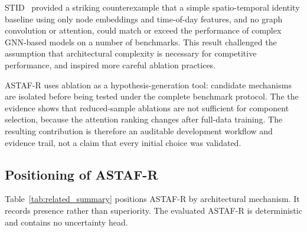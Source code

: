 \documentclass[fleqn,10pt]{wlscirep}
\newenvironment{changedcontent}{\color{changeblue}}{}
\begin{document}
STID~\cite{shao2022stgcn} provided a striking counterexample that a simple spatio-temporal identity baseline using only node embeddings and time-of-day features, and no graph convolution or attention, could match or exceed the performance of complex GNN-based models on a number of benchmarks. This result challenged the assumption that architectural complexity is necessary for competitive performance, and inspired more careful ablation practices.

\begin{changedcontent}
ASTAF-R uses ablation as a hypothesis-generation tool: candidate mechanisms
are isolated before being tested under the complete benchmark protocol. The
the evidence shows that reduced-sample ablations are not sufficient for
component selection, because the attention ranking changes after full-data
training. The resulting contribution is therefore an auditable development
workflow and evidence trail, not a claim that every initial choice was
validated.
\end{changedcontent}

\subsection{Positioning of ASTAF-R}

\begin{changedcontent}
Table~\ref{tab:related_summary} positions ASTAF-R by architectural
mechanism. It records presence rather than superiority. The evaluated ASTAF-R
is deterministic and contains no uncertainty head.
\end{changedcontent}
\end{document}

